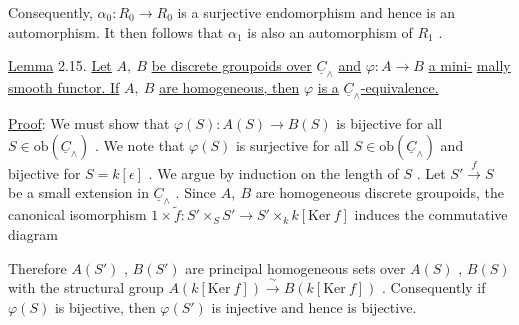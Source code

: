 Consequently, $\alpha_0 : R_0 \to R_0$ is a surjective endomorphism and hence is an automorphism. It then follows that $\alpha_1$ is also an automorphism of $R_1$ .

\underline{Lemma} 2.15.  \underline{Let} $A,\ B$ \underline{be discrete groupoids over} $\underline{C}_\wedge$ \underline{and} $\varphi : A \to B$ \underline{a mini-} \underline{mally smooth functor. If} $A,\ B$ \underline{are homogeneous, then} $\varphi$ \underline{is a} $\underline{C}_\wedge$\underline{-equivalence.}

\underline{Proof}:  We must show that $\varphi(S) : A(S) \longrightarrow B(S)$ is bijective for all $S \in \mathrm{ob}(\underline{C}_\wedge)$ . We note that $\varphi(S)$ is surjective for all $S \in \mathrm{ob}(\underline{C}_\wedge)$ and bijective for $S = k[\epsilon]$ . We argue by induction on the length of $S$ . Let $S' \overset{f}{\longrightarrow} S$ be a small extension in $\underline{C}_\wedge$ . Since $A,\ B$ are homogeneous discrete groupoids, the canonical isomorphism $1 \times \tilde{f} : S' \times_S S' \longrightarrow S' \times_k k[\mathrm{Ker}\ f]$ induces the commutative diagram
Therefore  $A(S')$ , $B(S')$  are principal homogeneous sets over  $A(S)$ , $B(S)$  with the structural group  $A(k[\mathrm{Ker}\ f]) \xrightarrow{\ \sim\ } B(k[\mathrm{Ker}\ f])$  . Consequently if  $\varphi(S)$  is bijective, then  $\varphi(S')$  is injective and hence is bijective.

